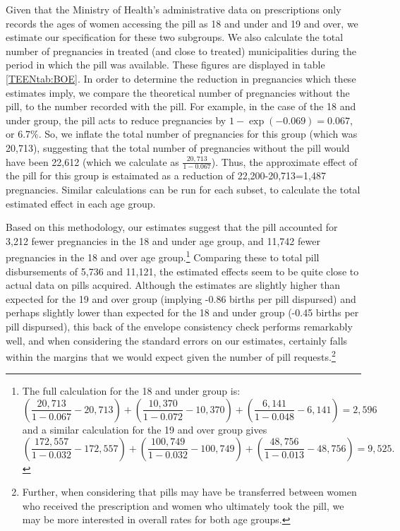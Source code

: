 \documentclass[11pt,subeqn]{article}
\begin{document}
\begin{spacing}{1.4}
Given that the Ministry of Health's administrative data on prescriptions only
records the ages of women accessing the pill as 18 and under and 19 and over,
we estimate our specification for these two subgroups.  We also
calculate the total number of pregnancies in treated (and close to treated)
municipalities during the period in which the pill was available.  These 
figures are displayed in table \ref{TEENtab:BOE}.  In order to determine the
reduction in pregnancies which these estimates imply, we compare the 
theoretical number of pregnancies without the pill, to the number recorded 
with the pill.  For example, in the case of the 18 and under group, the pill acts 
to reduce pregnancies by $1-\exp(-0.069)=0.067$, or 6.7\%.  So, we inflate the 
total number of pregnancies for this group (which was 20,713), suggesting that 
the total number of pregnancies without the pill would have been 22,612 (which
we calculate as $\frac{20,713}{1-0.067}$).  Thus, the approximate effect of the 
pill for this group is estaimated as a reduction of 22,200-20,713=1,487
pregnancies.  Similar calculations can be run for each subset, to calculate the
total estimated effect in each age group.

Based on this methodology, our estimates suggest that the pill accounted for 
3,212 fewer pregnancies in the 18 and under age group, and 11,742 fewer 
pregnancies in the 18 and over age group.\footnote{The full calculation for the 
18 and under group is:
\begin{equation}
\nonumber
\left(\frac{20,713}{1-0.067}-20,713\right)+
\left(\frac{10,370}{1-0.072}-10,370\right)+
\left(\frac{6,141}{1-0.048}-6,141\right)=2,596
\end{equation}
and a similar calculation for the 19 and over group gives 
\begin{equation}
\nonumber
\left(\frac{172,557}{1-0.032}-172,557\right)+
\left(\frac{100,749}{1-0.032}-100,749\right)+
\left(\frac{48,756}{1-0.013}-48,756\right)=9,525.
\end{equation}
}
Comparing these to total pill disbursements of 5,736 and 11,121, the estimated
effects seem to be quite close to actual data on pills acquired.  Although the
estimates are slightly higher than expected for the 19 and over group (implying
-0.86 births per pill dispursed) and perhaps slightly lower than expected for the
18 and under group (-0.45 births per pill dispursed), this back of the envelope 
consistency check performs remarkably well, and when considering the standard 
errors on our estimates, certainly falls within the margins that we would expect
given the number of pill requests.\footnote{Further, when considering that
pills may have be transferred between women who received the prescription and
women who ultimately took the pill, we may be more interested in overall rates
for both age groups.}


\end{spacing}
\end{document}
